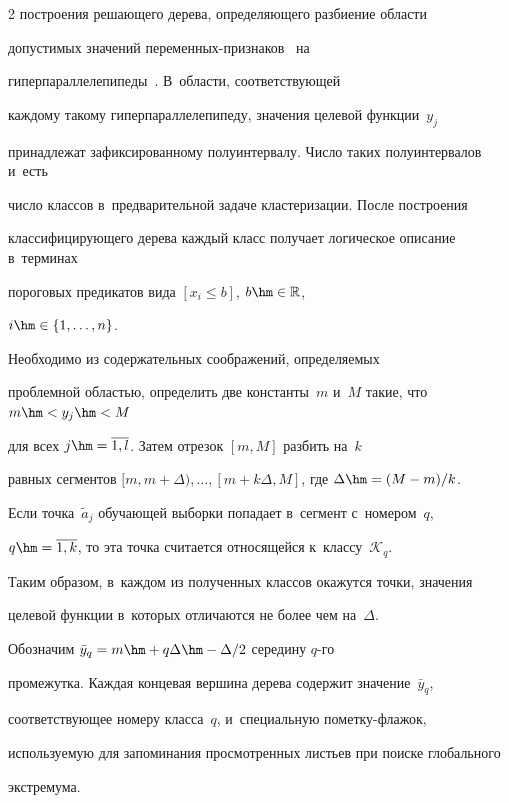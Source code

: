 \begin{multicols}{2}
  построения решающего дерева, определяющего разбиение области 


  допустимых значений пе\-ре\-мен\-ных-при\-зна\-ков~\cite{6-don} на 


  гиперпараллелепипеды~\cite{15-don}. В~об\-ласти, соответствующей 


  каждому такому гиперпараллелепипеду, значения целевой функции~$y_j$ 


  принадлежат зафиксированному полуинтервалу. Число таких полуинтервалов и~есть 


  число классов в~предварительной задаче кластеризации. После построения 


  классифицирующего дерева каждый класс получает логическое описание в~терминах 


  пороговых предикатов вида $[x_i \leq b]$,  $b\hm\in \mathbb{R}$, 


   $i\hm\in \{1,\ldots ,n \}$.





Необходимо из содержательных соображений, определяемых 


проблемной областью, определить две константы~$m$ и~$M$ такие, что $m \hm< y_j \hm< M$ 


для всех $j\hm=\overline{1,l}$. Затем отрезок $[m,M ]$ разбить на~$k$ 


равных сегментов $[m, m+\Delta),\dots,[m+k\Delta,M]$, где $\Delta\hm=(M-m)/k$.


Если точка~$\tilde{a}_j$ обучающей выборки попадает в~сегмент с~номером~$q$, 


 $q\hm=\overline{1,k}$, то эта точка считается относящейся к~классу~$\mathcal{K}_q$.


Таким образом, в~каждом из  полученных классов окажутся точки, значения


 целевой функции в~которых отличаются не более чем на~$\Delta$.





Обозначим $\bar{y}_q = m\hm+q  \Delta \hm- \Delta/2$ середину $q$-го


 промежутка. Каждая концевая вершина дерева содержит значение~$\bar{y}_q$, 


 соответствующее номеру класса~$q$, и~специальную по\-мет\-ку-фла\-жок, 


 исполь\-зу\-емую для запоминания просмотренных листьев при поиске глобального 


 экстремума.






\end{multicols}
